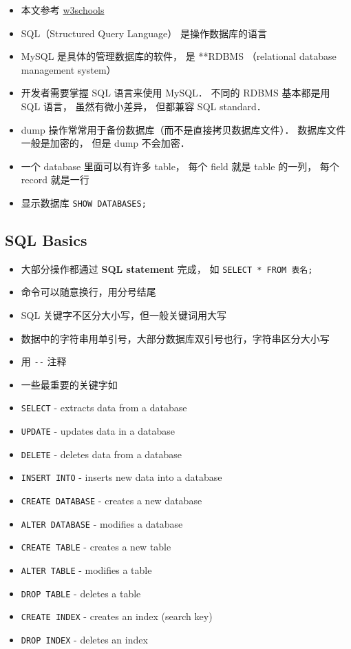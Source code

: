 
\begin{issues}
\issueDraft
\end{issues}

\begin{itemize}
\item 本文参考 \href{https://www.w3schools.com/sql/default.asp}{w3schools}
\item SQL（Structured Query Language） 是操作数据库的语言
\item MySQL 是具体的管理数据库的软件， 是 **RDBMS （relational database management system）
\item 开发者需要掌握 SQL 语言来使用 MySQL． 不同的 RDBMS 基本都是用 SQL 语言， 虽然有微小差异， 但都兼容 SQL standard．
\item dump 操作常常用于备份数据库（而不是直接拷贝数据库文件）． 数据库文件一般是加密的， 但是 dump 不会加密．
\item 一个 database 里面可以有许多 table， 每个 field 就是 table 的一列， 每个 record 就是一行
\item 显示数据库 \verb`SHOW DATABASES;`
\end{itemize}

\subsection{SQL Basics}
\begin{itemize}
\item 大部分操作都通过 \textbf{SQL statement} 完成， 如 \verb`SELECT * FROM 表名;`
\item 命令可以随意换行，用分号结尾
\item SQL 关键字不区分大小写，但一般关键词用大写
\item 数据中的字符串用单引号，大部分数据库双引号也行，字符串区分大小写
\item 用 \verb|--| 注释
\item 一些最重要的关键字如
\item \verb`SELECT` - extracts data from a database
\item \verb`UPDATE` - updates data in a database
\item \verb`DELETE` - deletes data from a database
\item \verb`INSERT INTO` - inserts new data into a database
\item \verb`CREATE DATABASE` - creates a new database
\item \verb`ALTER DATABASE` - modifies a database
\item \verb`CREATE TABLE` - creates a new table
\item \verb`ALTER TABLE` - modifies a table
\item \verb`DROP TABLE` - deletes a table
\item \verb`CREATE INDEX` - creates an index (search key)
\item \verb`DROP INDEX` - deletes an index
\end{itemize}

